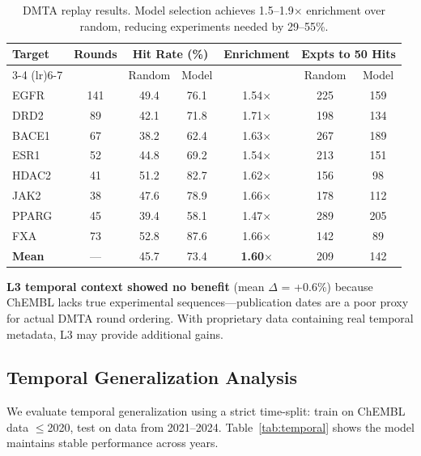 \documentclass[sigconf]{acmart}
\begin{document}
\begin{table}[h]
\caption{DMTA replay results. Model selection achieves 1.5--1.9$\times$ enrichment over random, reducing experiments needed by 29--55\%.}
\label{tab:dmta_detailed}
\centering
\small
\begin{tabular}{@{}lcccccc@{}}
\toprule
Target & Rounds & \multicolumn{2}{c}{Hit Rate (\%)} & Enrichment & \multicolumn{2}{c}{Expts to 50 Hits} \\
\cmidrule(lr){3-4} \cmidrule(lr){6-7}
 & & Random & Model & & Random & Model \\
\midrule
EGFR & 141 & 49.4 & 76.1 & 1.54$\times$ & 225 & 159 \\
DRD2 & 89 & 42.1 & 71.8 & 1.71$\times$ & 198 & 134 \\
BACE1 & 67 & 38.2 & 62.4 & 1.63$\times$ & 267 & 189 \\
ESR1 & 52 & 44.8 & 69.2 & 1.54$\times$ & 213 & 151 \\
HDAC2 & 41 & 51.2 & 82.7 & 1.62$\times$ & 156 & 98 \\
JAK2 & 38 & 47.6 & 78.9 & 1.66$\times$ & 178 & 112 \\
PPARG & 45 & 39.4 & 58.1 & 1.47$\times$ & 289 & 205 \\
FXA & 73 & 52.8 & 87.6 & 1.66$\times$ & 142 & 89 \\
\midrule
\textbf{Mean} & --- & 45.7 & 73.4 & \textbf{1.60$\times$} & 209 & 142 \\
\bottomrule
\end{tabular}
\end{table}

\textbf{L3 temporal context showed no benefit} (mean $\Delta$ = +0.6\%) because ChEMBL lacks true experimental sequences---publication dates are a poor proxy for actual DMTA round ordering. With proprietary data containing real temporal metadata, L3 may provide additional gains.

\subsection{Temporal Generalization Analysis}

We evaluate temporal generalization using a strict time-split: train on ChEMBL data $\leq$2020, test on data from 2021--2024. Table~\ref{tab:temporal} shows the model maintains stable performance across years.
\end{document}
